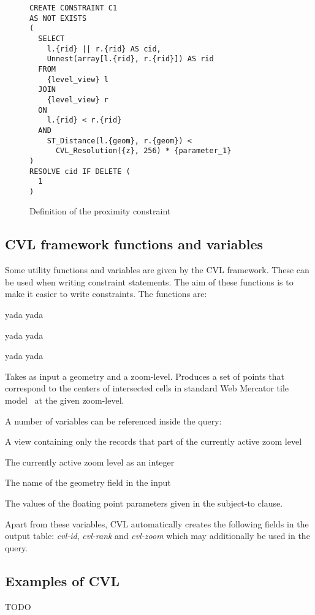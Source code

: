 \begin{figure}[htbp]
\begin{center}
\begin{lstlisting}
CREATE CONSTRAINT C1
AS NOT EXISTS
(
  SELECT 
    l.{rid} || r.{rid} AS cid,
    Unnest(array[l.{rid}, r.{rid}]) AS rid
  FROM
    {level_view} l
  JOIN
    {level_view} r
  ON
    l.{rid} < r.{rid}
  AND
    ST_Distance(l.{geom}, r.{geom}) <
      CVL_Resolution({z}, 256) * {parameter_1}
)
RESOLVE cid IF DELETE (
  1
)
\end{lstlisting}
\caption{Definition of the proximity constraint}
\label{fig:proximity-definition}
\end{center}
\end{figure}




\subsection{CVL framework functions and variables}



Some utility functions and variables are given by the CVL framework. These can be used when writing constraint statements. The aim of these functions is to make it easier to write constraints. The functions are:

 yada yada

 yada yada

 yada yada

Takes as input a geometry and a zoom-level. Produces a set of points that correspond to the centers of intersected cells in standard Web Mercator tile model~\cite{osm?} at the given zoom-level.

A number of variables can be referenced inside the query:

 A view containing only the records that part of the currently active zoom level

 The currently active zoom level as an integer

 The name of the geometry field in the input

 The values of the floating point parameters given in the subject-to clause.

Apart from these variables, CVL automatically creates the following fields in the output table: \emph{cvl-id}, \emph{cvl-rank} and \emph{cvl-zoom} which may additionally be used in the query.

\subsection{Examples of CVL}

TODO
